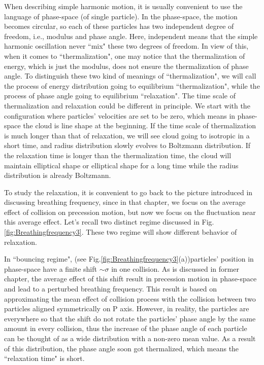 \documentclass[aps,pre,twocolumn,groupedaddress]{revtex4-1}
\begin{document}
When describing simple harmonic motion, it is usually convenient to use the language of phase-space (of single particle). In the phase-space, the motion becomes circular, so each of these particles has two independent degree of freedom, i.e., modulus and phase angle. Here, independent means that the simple harmonic oscillation never ``mix" these two degrees of freedom. In view of this, when it comes to ``thermalization", one may notice that the thermalization of energy, which is just the modulus, does not ensure the thermalization of phase angle. To distinguish these two kind of meanings of ``thermalization", we will call the process of energy distribution going to equilibrium ``thermalization", while the process of phase angle going to equilibrium ``relaxation". The time scale of thermalization and relaxation could be different in principle. We start with the configuration where particles' velocities are set to be zero, which means in phase-space the cloud is line shape at the beginning. If the time scale of thermalization is much longer than that of relaxation, we will see cloud going to isotropic in a short time, and radius distribution slowly evolves to Boltzmann distribution. If the relaxation time is longer than the thermalization time, the cloud will maintain elliptical shape or elliptical shape for a long time while the radius distribution is already Boltzmann.

To study the relaxation, it is convenient to go back to the picture introduced in discussing breathing frequency, since in that chapter, we focus on the average effect of collision on precession motion, but now we focus on the fluctuation near this average effect. Let's recall two distinct regime discussed in Fig.\ref{fig:Breathingfrequency3}. These two regime will show different behavior of relaxation.

In ``bouncing regime", (see Fig.\ref{fig:Breathingfrequency3}(a))particles' position in phase-space have a finite shift $\sim\sigma$ in one collision. As is discussed in former chapter, the average effect of this shift result in precession motion in phase-space and lead to a perturbed breathing frequency. This result is based on approximating the mean effect of collision process with the collision between two particles aligned symmetrically on P axis. However, in reality, the particles 
are everywhere so that the shift do not rotate the particles' phase angle by the same amount in every collision, thus the increase of the phase angle of each particle can be thought of as a wide distribution with a non-zero mean value. As a result of this distribution, the phase angle soon got thermalized, which means the ``relaxation time" is short.
\end{document}
